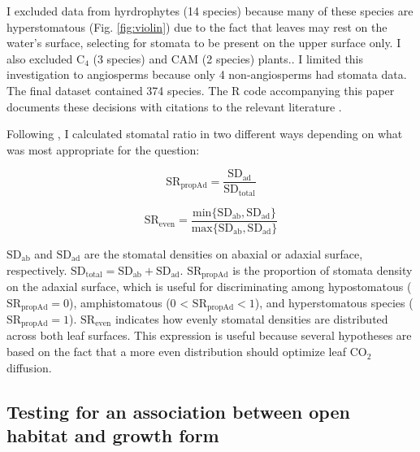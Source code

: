 \documentclass[12pt, oneside]{article}
\begin{document}
I excluded data from hyrdrophytes (14 species) because many of these species are hyperstomatous (Fig. \ref{fig:violin}) due to the fact that leaves may rest on the water's surface, selecting for stomata to be present on the upper surface only. I also excluded C$_4$ (3 species) and CAM (2 species) plants.. I limited this investigation to angiosperms because only 4 non-angiosperms had stomata data. The final dataset contained 374 species. The R code accompanying this paper documents these decisions with citations to the relevant literature \citep{Muir_dryad}.

Following \cite{Muir_2015}, I calculated stomatal ratio in two different ways depending on what was most appropriate for the question: 

\begin{equation} \label{eq:SRpropAd} 
  \mathrm{SR_{propAd}} = \frac{\mathrm{SD_{ad}}}{\mathrm{SD_{total}}}
\end{equation}

\begin{equation} \label{eq:SReven1} 
  \mathrm{SR_{even}} = \frac{\mathrm{min}\{\mathrm{SD_{ab}}, \mathrm{SD_{ad}}\}}{\mathrm{max}\{\mathrm{SD_{ab}}, \mathrm{SD_{ad}}\}}
\end{equation}

$\mathrm{SD_{ab}}$ and $\mathrm{SD_{ad}}$ are the stomatal densities on abaxial or adaxial surface, respectively. $\mathrm{SD_{total}} = \mathrm{SD_{ab}} + \mathrm{SD_{ad}}$. $\mathrm{SR_{propAd}}$ is the proportion of stomata density on the adaxial surface, which is useful for discriminating among hypostomatous ($\mathrm{SR_{propAd}} = 0$), amphistomatous (0 < $\mathrm{SR_{propAd}} < 1$), and hyperstomatous species ($\mathrm{SR_\mathrm{propAd}} = 1$). $\mathrm{SR_\mathrm{even}}$ indicates how evenly stomatal densities are distributed across both leaf surfaces. This expression is useful because several hypotheses are based on the fact that a more even distribution should optimize leaf CO$_2$ diffusion.



\subsection*{Testing for an association between open habitat and growth form}
\end{document}
